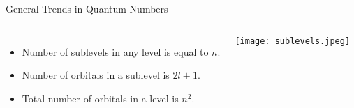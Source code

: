 \documentclass[notes=hide]{beamer}
\begin{document}
\begin{frame}{General Trends in Quantum Numbers}
	\begin{columns}
	\begin{itemize}
		\item Number of sublevels in any level is equal to $n$.
		\item Number of orbitals in a sublevel is $2l + 1$.
		\item Total number of orbitals in a level is $n^2$.
	\end{itemize}
	\begin{center}
		\texttt{[image: sublevels.jpeg]}
	\end{center}
	\end{columns}
\end{frame}
\end{document}
